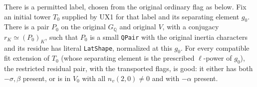 \begin{proposition}
There is a permitted label, chosen from the original
ordinary flag as below.  Fix an initial tower $T_0$
supplied by UX1 for that label and its separating element
$g_0$.  There is a pair $P_0$ on the original
$G_{\mathbb Q}$ and original $V$, with a conjugacy
$r_K\simeq(P_0)_K$, such that $P_0$ is a small
\texttt{QPair} with the original inertia characters and its
residue has literal \texttt{LatShape}, normalized at this
$g_0$.  For every compatible fit extension of $T_0$
(whose separating element is the prescribed $\ell$-power
of $g_0$), the restricted residual pair, with the
transported flags, is good: it either has both
$-\sigma,\beta$ present, or is in $V_0$ with all
$n_v(2,0)\ne0$ and with $-\alpha$ present.
\end{proposition}

